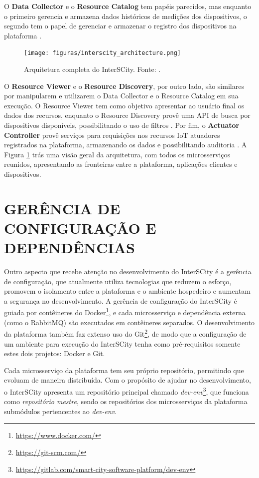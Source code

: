 O \textbf{Data Collector} e o \textbf{Resource Catalog} tem papéis parecidos,
mas enquanto o primeiro gerencia e armazena dados históricos de medições dos
dispositivos, o segundo tem o papel de gerenciar e armazenar o registro dos
dispositivos na plataforma \cite{delesposte2017}.

\begin{figure}
  \centering
    \texttt{[image: figuras/interscity\_architecture.png]}
    \caption{Arquitetura completa do InterSCity. Fonte: .}
  \label{fig:interscity-architecture}
\end{figure}


O \textbf{Resource Viewer} e o \textbf{Resource Discovery}, por outro lado,
são similares por manipularem e utilizarem o Data Collector e o Resource
Catalog em sua execução. O Resource Viewer tem como objetivo apresentar ao
usuário final os dados dos recursos, enquanto o Resource Discovery provê uma API
 de busca por dispositivos disponíveis, possibilitando o uso de filtros
\cite{delesposte2017}. Por fim, o \textbf{Actuator Controller} provê serviços
para requisições nos recursos IoT atuadores registrados na plataforma,
armazenando os dados e possibilitando auditoria \cite{delesposte2017}. A Figura
\ref{fig:interscity-architecture} trás uma visão geral da arquitetura, com todos
os microsserviços reunidos, apresentando as fronteiras entre a plataforma,
aplicações clientes e dispositivos.

\section{GERÊNCIA DE CONFIGURAÇÃO E DEPENDÊNCIAS}

Outro aspecto que recebe atenção no desenvolvimento do InterSCity é a gerência
de configuração, que atualmente utiliza tecnologias que reduzem o esforço,
promovem o isolamento entre a plataforma e o ambiente hospedeiro
e aumentam a segurança no desenvolvimento. A gerência de configuração do
InterSCity é guiada por contêineres do
Docker\footnote{\url{https://www.docker.com/}}, e cada microsserviço e
dependência externa (como o RabbitMQ) são executados em
contêineres separados. O desenvolvimento da plataforma também faz extenso
uso do Git\footnote{\url{https://git-scm.com/}}, de modo que a
configuração de um ambiente para execução do InterSCity tenha como
pré-requisitos somente estes dois projetos: Docker e Git.

Cada microsserviço da plataforma tem seu próprio repositório, permitindo que
evoluam de maneira distribuída. Com o propósito de ajudar no desenvolvimento,
o InterSCity apresenta um repositório principal chamado
\textit{dev-env}\footnote{\url{https://gitlab.com/smart-city-software-platform/dev-env}},
que funciona como \textit{repositório mestre}, sendo os repositórios dos
microsserviços da plataforma submódulos pertencentes ao \textit{dev-env}.

